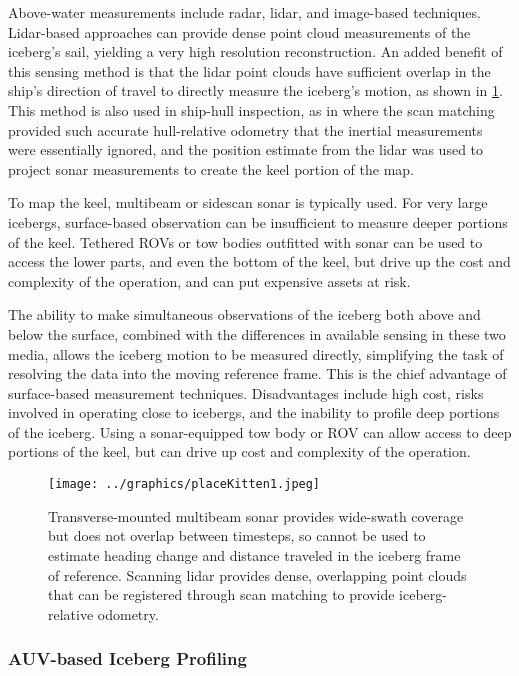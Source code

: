Above-water measurements include radar, lidar, and image-based techniques. Lidar-based approaches can provide dense point cloud measurements of the iceberg's sail, yielding a very high resolution reconstruction. An added benefit of this sensing method is that the lidar point clouds have sufficient overlap in the ship's direction of travel to directly measure the iceberg's motion, as shown in \ref{fig:LidarOdometry}. This method is also used in ship-hull inspection, as in \cite{Singapore} where the scan matching provided such accurate hull-relative odometry that the inertial measurements were essentially ignored, and the position estimate from the lidar was used to project sonar measurements to create the keel portion of the map.

To map the keel, multibeam or sidescan sonar is typically used. For very large icebergs, surface-based observation can be insufficient to measure deeper portions of the keel. Tethered ROVs or tow bodies outfitted with sonar can be used to access the lower parts, and even the bottom of the keel, but drive up the cost and complexity of the operation, and can put expensive assets at risk. 

The ability to make simultaneous observations of the iceberg both above and below the surface, combined with the differences in available sensing in these two media, allows the iceberg motion to be measured directly, simplifying the task of resolving the data into the moving reference frame. This is the chief advantage of surface-based measurement techniques. Disadvantages include high cost, risks involved in operating close to icebergs, and the inability to profile deep portions of the iceberg. Using a sonar-equipped tow body or ROV can allow access to deep portions of the keel, but can drive up cost and complexity of the operation. 

\begin{figure}[htbp]
   \centering
   \texttt{[image: ../graphics/placeKitten1.jpeg]} %
   \caption{Transverse-mounted multibeam sonar provides wide-swath coverage but does not overlap between timesteps, so cannot be used to estimate heading change and distance traveled in the iceberg frame of reference. Scanning lidar provides dense, overlapping point clouds that can be registered through scan matching to provide iceberg-relative odometry. }
   \label{fig:LidarOdometry}
\end{figure}

\subsubsection{AUV-based Iceberg Profiling}

